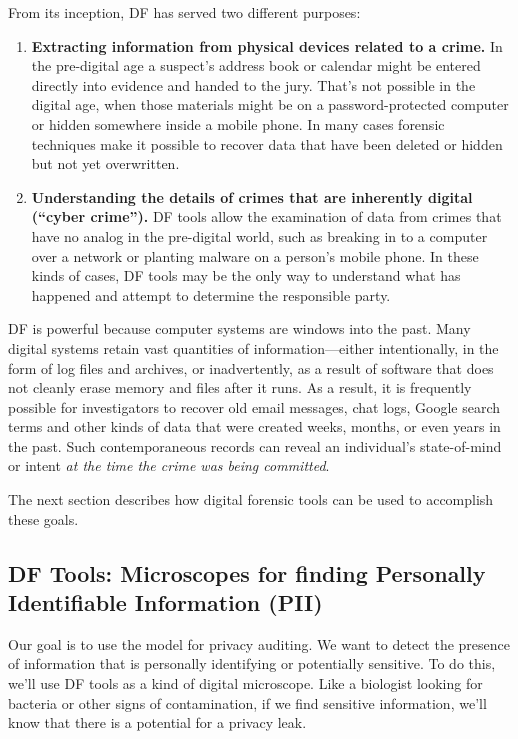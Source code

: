 From its inception, DF has served two different purposes:

\begin{enumerate}
\item \textbf{Extracting information from physical devices related to
  a crime.} In the pre-digital age a suspect's address book or
calendar might be entered directly into evidence and handed to the
jury. That's not possible in the digital age, when those materials
might be on a password-protected computer or hidden somewhere inside a
mobile phone. In many cases forensic techniques make it possible to
recover data that have been deleted or hidden but not yet
overwritten. 

\item \textbf{Understanding the details of crimes that are inherently
  digital (``cyber crime'').} DF tools allow the examination of
data from crimes that have no analog in the pre-digital world, such as
breaking in to a computer over a network or planting malware on a
person's mobile phone. In these kinds of cases, DF tools may be the
only way to understand what has happened and attempt to determine the
responsible party. 

\end{enumerate}

DF is powerful because computer systems are windows into the
past. Many digital systems retain vast quantities of
information---either intentionally, in the form of log files and
archives, or inadvertently, as a result of software that does not
cleanly erase memory and files after it runs. As a result, it
is frequently possible for investigators to recover old email
messages, chat logs, Google search terms and other kinds of data
that were created
weeks, months, or even years in the past. Such contemporaneous records
can reveal an individual's state-of-mind or intent \emph{at the time
  the crime was being committed}.

The next section describes how digital forensic tools can be used to
accomplish these goals.

\subsection{DF Tools: Microscopes for finding Personally Identifiable Information (PII) }

Our goal is to use
the model for privacy auditing. We want to detect the presence of
information that is personally identifying or potentially
sensitive. To do this, we'll use DF tools as a kind of digital
microscope. Like a biologist looking for bacteria or other signs of
contamination, if we find sensitive information, we'll know that there is a potential
for a privacy leak.

